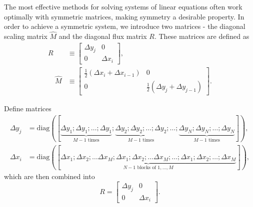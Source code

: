 \documentclass{article}
\numberwithin{equation}{section}
\begin{document}
The most effective methods for solving systems of linear equations often work optimally with symmetric matrices, making symmetry a desirable property. In order to achieve a symmetric system, we introduce two matrices - the diagonal scaling matrix $\hat{M}$ and the diagonal flux matrix $R$. These matrices are defined as
\begin{align*}
R &\equiv\left[\begin{array}{cc}
\Delta y_j & 0 \\
0 & \Delta x_i
\end{array}\right], \\
\quad \hat{M} & \equiv\left[\begin{array}{cc}
\frac{1}{2}\left(\Delta x_i+\Delta x_{i-1}\right) & 0 \\
0 & \frac{1}{2}\left(\Delta y_j+\Delta y_{j-1}\right)
\end{array}\right].
\end{align*}

Define matrices 
\begin{equation*}
\begin{aligned}
	\Delta y_j&=\text{diag}([\underbrace{\Delta y_1; \Delta y_1; \dotsc;\Delta y_1}_{M-1\text{ times}}; \underbrace{\Delta y_2; \Delta y_2; \dotsc;\Delta y_2}_{M-1\text{ times}};\dotsc;\underbrace{\Delta y_N; \Delta y_N; \dotsc;\Delta y_N}_{M-1\text{ times}}]),\\
	\Delta x_i&=\text{diag}([\underbrace{\Delta x_1; \Delta x_2;\dotsc\Delta x_M;\Delta x_1; \Delta x_2;\dotsc\Delta x_M; \dotsc;\Delta x_1; \Delta x_2;\dotsc;\Delta x_M}_{N-1\text{ blocks of } 1,\dotsc,M}]),
\end{aligned}
\end{equation*}
which are then combined into
\begin{equation*}
R =\left[\begin{array}{cc}
\Delta y_j & 0 \\
0 & \Delta x_i
\end{array}\right].
\end{equation*}
\end{document}
